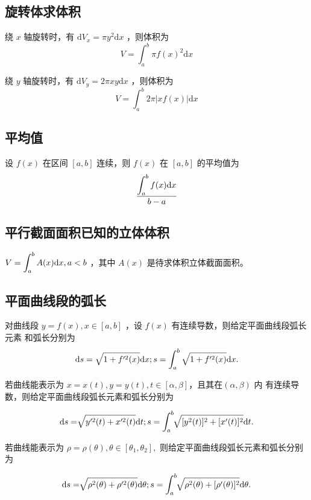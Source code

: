 \subsection{旋转体求体积}


绕 $ x $ 轴旋转时，有 $ \mathrm{d}V_x = \pi y^2 \mathrm{d}x $ ，则体积为$$
    V = \int_a^b \pi f(x)^2 \mathrm{d}x
$$ 


绕 $ y $ 轴旋转时，有 $ \mathrm{d}V_y = 2\pi xy \mathrm{d} x $ ，则体积为$$
    V = \int_a^b 2\pi \left|xf(x)\right|\mathrm{d}x
$$ 

\subsection{平均值}

设 $ f(x) $ 在区间 $ [a,b] $ 连续，则 $ f(x) $ 在 $ [a,b] $ 的平均值为
$$
    \dfrac{\displaystyle \int_a^b f(x)\mathrm{d}x}{b-a}
$$ 

\subsection{平行截面面积已知的立体体积}

$ \displaystyle V = \int_a^bA(x)\mathrm{d}x,a<b $ ，其中 $ A(x) $ 是待求体积立体截面面积。

\subsection{平面曲线段的弧长}


对曲线段 $ y = f(x),x\in[a,b] $ ，设 $ f(x) $ 有连续导数，则给定平面曲线段弧长元素
和弧长分别为
$$ \displaystyle \mathrm{d}s = \displaystyle\sqrt{1+f'^2(x)}\mathrm{d}x;
s = \int_a^b \displaystyle\sqrt{1+f'^2(x)}\mathrm{d}x. $$


若曲线能表示为 $ x = x(t),y=y(t),t\in[\alpha,\beta] $，且其在$ (\alpha,\beta) $ 内
有连续导数，则给定平面曲线段弧长元素和弧长分别为

$$ \displaystyle \mathrm{d}s = \displaystyle\sqrt[]{y'^2(t)+x'^2(t)}\mathrm{d}t;
s = \int_a^b \displaystyle\sqrt[]{[y^2(t)]^2+[x'(t)]^2}\mathrm{d}t. $$



若曲线能表示为 $ \rho = \rho(\theta),\theta\in[\theta_1,\theta_2], $
则给定平面曲线段弧长元素和弧长分别为

$$ \displaystyle \mathrm{d}s = \displaystyle\sqrt[]{\rho^2(\theta)+\rho'^2(\theta)}\mathrm{d}\theta ;
s = \int_a^b \displaystyle\sqrt[]{\rho^2(\theta)+[\rho'(\theta)]^2}\mathrm{d}\theta. $$


